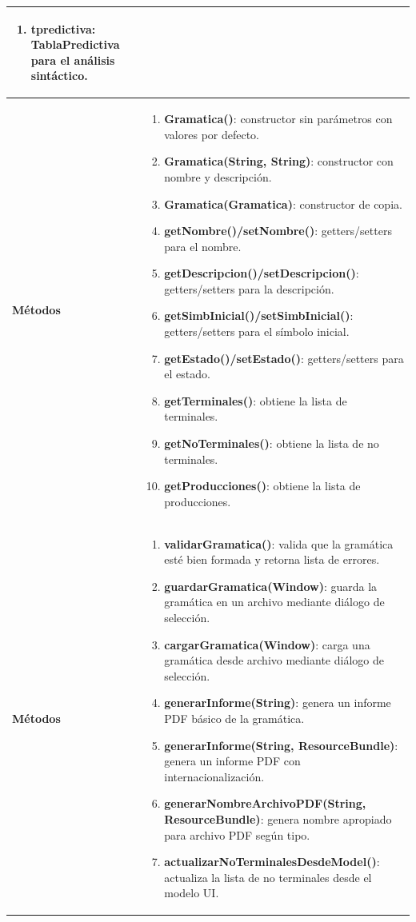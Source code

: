 \begin{longtable}[H]{|>{\columncolor[rgb]{0.63,0.79,0.95}}m{6cm} | m{8.5cm} |}
\begin{enumerate}
    \item \textbf{tpredictiva}: TablaPredictiva para el análisis sintáctico.
\end{enumerate} \\ \hline
\textbf{Métodos} &
\begin{enumerate}
    \item \textbf{Gramatica()}: constructor sin parámetros con valores por defecto.
    \item \textbf{Gramatica(String, String)}: constructor con nombre y descripción.
    \item \textbf{Gramatica(Gramatica)}: constructor de copia.
    \item \textbf{getNombre()/setNombre()}: getters/setters para el nombre.
    \item \textbf{getDescripcion()/setDescripcion()}: getters/setters para la descripción.
    \item \textbf{getSimbInicial()/setSimbInicial()}: getters/setters para el símbolo inicial.
    \item \textbf{getEstado()/setEstado()}: getters/setters para el estado.
    \item \textbf{getTerminales()}: obtiene la lista de terminales.
    \item \textbf{getNoTerminales()}: obtiene la lista de no terminales.
    \item \textbf{getProducciones()}: obtiene la lista de producciones.
\end{enumerate} \\ \hline
\textbf{Métodos} &
\begin{enumerate}
    \item \textbf{validarGramatica()}: valida que la gramática esté bien formada y retorna lista de errores.
    \item \textbf{guardarGramatica(Window)}: guarda la gramática en un archivo mediante diálogo de selección.
    \item \textbf{cargarGramatica(Window)}: carga una gramática desde archivo mediante diálogo de selección.
    \item \textbf{generarInforme(String)}: genera un informe PDF básico de la gramática.
    \item \textbf{generarInforme(String, ResourceBundle)}: genera un informe PDF con internacionalización.
    \item \textbf{generarNombreArchivoPDF(String, ResourceBundle)}: genera nombre apropiado para archivo PDF según tipo.
    \item \textbf{actualizarNoTerminalesDesdeModel()}: actualiza la lista de no terminales desde el modelo UI.

\end{enumerate}
\end{longtable}
